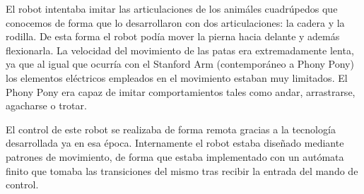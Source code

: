 El robot intentaba imitar las articulaciones de los animáles cuadrúpedos que conocemos de forma que lo desarrollaron con dos articulaciones: la cadera y la rodilla. De esta forma el robot podía mover la pierna hacia delante y además flexionarla. La velocidad del movimiento de las patas era extremadamente lenta, ya que al igual que ocurría con el Stanford Arm (contemporáneo a Phony Pony) los elementos eléctricos empleados en el movimiento estaban muy limitados. El Phony Pony era capaz de imitar comportamientos tales como andar, arrastrarse, agacharse o trotar.

El control de este robot se realizaba de forma remota gracias a la tecnología desarrollada ya en esa época. Internamente el robot estaba diseñado mediante patrones de movimiento, de forma que estaba implementado con un autómata finito que tomaba las transiciones del mismo tras recibir la entrada del mando de control. 
